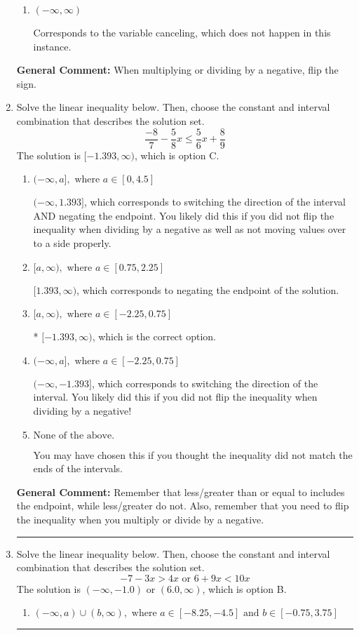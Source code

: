 \documentclass{extbook}[14pt]
\newcommand{\litem}[1]{\item #1

\rule{\textwidth}{0.4pt}}
\begin{document}
\begin{enumerate}
{\begin{enumerate}[label=\Alph*.]
Corresponds to including the endpoints AND negating.
\item \( (-\infty, \infty) \)

Corresponds to the variable canceling, which does not happen in this instance.
\end{enumerate}

\textbf{General Comment:} When multiplying or dividing by a negative, flip the sign.
}
\litem{
Solve the linear inequality below. Then, choose the constant and interval combination that describes the solution set.
\[ \frac{-8}{7} - \frac{5}{8} x \leq \frac{5}{6} x + \frac{8}{9} \]The solution is \( [-1.393, \infty) \), which is option C.\begin{enumerate}[label=\Alph*.]
\item \( (-\infty, a], \text{ where } a \in [0, 4.5] \)

 $(-\infty, 1.393]$, which corresponds to switching the direction of the interval AND negating the endpoint. You likely did this if you did not flip the inequality when dividing by a negative as well as not moving values over to a side properly.
\item \( [a, \infty), \text{ where } a \in [0.75, 2.25] \)

 $[1.393, \infty)$, which corresponds to negating the endpoint of the solution.
\item \( [a, \infty), \text{ where } a \in [-2.25, 0.75] \)

* $[-1.393, \infty)$, which is the correct option.
\item \( (-\infty, a], \text{ where } a \in [-2.25, 0.75] \)

 $(-\infty, -1.393]$, which corresponds to switching the direction of the interval. You likely did this if you did not flip the inequality when dividing by a negative!
\item \( \text{None of the above}. \)

You may have chosen this if you thought the inequality did not match the ends of the intervals.
\end{enumerate}

\textbf{General Comment:} Remember that less/greater than or equal to includes the endpoint, while less/greater do not. Also, remember that you need to flip the inequality when you multiply or divide by a negative.
}
\litem{
Solve the linear inequality below. Then, choose the constant and interval combination that describes the solution set.
\[ -7 - 3 x > 4 x \text{ or } 6 + 9 x < 10 x \]The solution is \( (-\infty, -1.0) \text{ or } (6.0, \infty) \), which is option B.\begin{enumerate}[label=\Alph*.]
\item \( (-\infty, a) \cup (b, \infty), \text{ where } a \in [-8.25, -4.5] \text{ and } b \in [-0.75, 3.75] \)


\end{enumerate}}
\end{enumerate}
\end{document}
